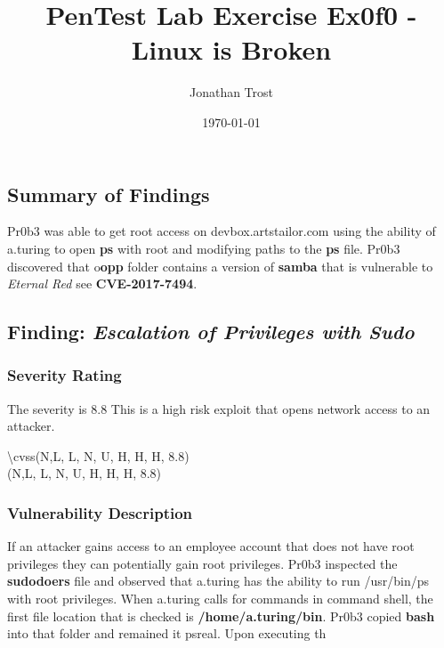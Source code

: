 \documentclass[notitlepage]{article}
\begin{document}
	
	
	\title{PenTest Lab Exercise Ex0f0 - Linux is Broken}
	\author{Jonathan Trost}
	\date{\isodate\today}
	
	\maketitle
	
	\tableofcontents
	
	\newpage 
	
	\subsection{Summary of Findings}
	\indent Pr0b3 was able to get root access on devbox.artstailor.com using the ability of a.turing to open \textbf{ps} with root and modifying paths to the \textbf{ps} file. Pr0b3 discovered that o\textbf{opp} folder contains a version of \textbf{samba} that is vulnerable to \textit{Eternal Red} see \textbf{CVE-2017-7494}.
	
	\subsection{Finding: \emph{Escalation of Privileges with Sudo}}
	
	\subsubsection{Severity Rating}
	\indent The severity is 8.8 This is a high risk exploit that opens network access to an attacker. 
	
	\textbackslash cvss(N,L, L, N, U, H, H, H, 8.8)\\
	\cvss(N,L, L, N, U, H, H, H, 8.8) \\
	
	\subsubsection{Vulnerability Description}
	\indent If an attacker gains access to an employee account that does not have root privileges they can potentially gain root privileges.  Pr0b3 inspected the \textbf{sudodoers} file and observed that a.turing has the ability to run /usr/bin/ps with root privileges.  When a.turing calls for commands in command shell, the first file location that is checked is \textbf{/home/a.turing/bin}.  Pr0b3 copied \textbf{bash} into that folder and remained it psreal.  Upon executing th
	
\end{document}
